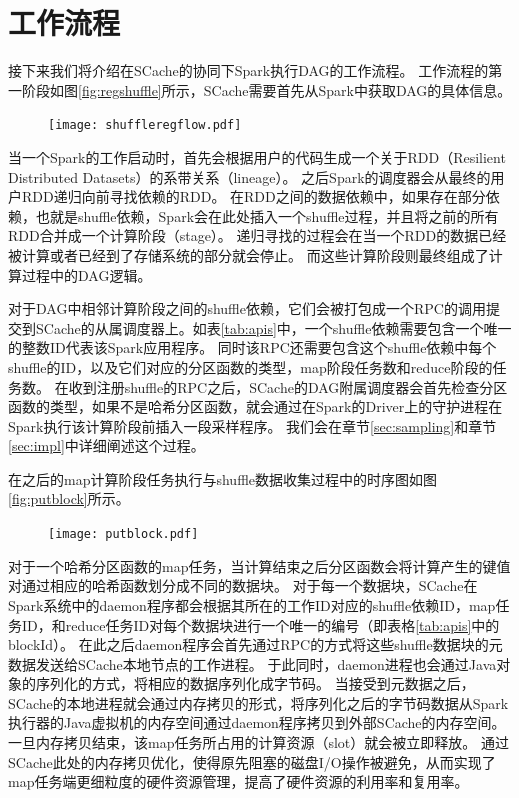 \section{工作流程}

接下来我们将介绍在SCache的协同下Spark执行DAG的工作流程。
工作流程的第一阶段如图\ref{fig:regshuffle}所示，SCache需要首先从Spark中获取DAG的具体信息。

\begin{figure}[!htp]
	\centering
	\texttt{[image: shuffleregflow.pdf]}
\end{figure}

当一个Spark的工作启动时，首先会根据用户的代码生成一个关于RDD（Resilient Distributed Datasets）的系带关系（lineage）。
之后Spark的调度器会从最终的用户RDD递归向前寻找依赖的RDD。
在RDD之间的数据依赖中，如果存在部分依赖，也就是shuffle依赖，Spark会在此处插入一个shuffle过程，并且将之前的所有RDD合并成一个计算阶段（stage）。
递归寻找的过程会在当一个RDD的数据已经被计算或者已经到了存储系统的部分就会停止。
而这些计算阶段则最终组成了计算过程中的DAG逻辑。

对于DAG中相邻计算阶段之间的shuffle依赖，它们会被打包成一个RPC的调用提交到SCache的从属调度器上。如表\ref{tab:apis}中，一个shuffle依赖需要包含一个唯一的整数ID代表该Spark应用程序。
同时该RPC还需要包含这个shuffle依赖中每个shuffle的ID，以及它们对应的分区函数的类型，map阶段任务数和reduce阶段的任务数。
在收到注册shuffle的RPC之后，SCache的DAG附属调度器会首先检查分区函数的类型，如果不是哈希分区函数，就会通过在Spark的Driver上的守护进程在Spark执行该计算阶段前插入一段采样程序。
我们会在章节\ref{sec:sampling}和章节\ref{sec:impl}中详细阐述这个过程。

在之后的map计算阶段任务执行与shuffle数据收集过程中的时序图如图\ref{fig:putblock}所示。

\begin{figure}[!htp]
	\centering
	\texttt{[image: putblock.pdf]}
\end{figure}

对于一个哈希分区函数的map任务，当计算结束之后分区函数会将计算产生的键值对通过相应的哈希函数划分成不同的数据块。
对于每一个数据块，SCache在Spark系统中的daemon程序都会根据其所在的工作ID对应的shuffle依赖ID，map任务ID，和reduce任务ID对每个数据块进行一个唯一的编号（即表格\ref{tab:apis}中的blockId）。
在此之后daemon程序会首先通过RPC的方式将这些shuffle数据块的元数据发送给SCache本地节点的工作进程。
于此同时，daemon进程也会通过Java对象的序列化的方式，将相应的数据序列化成字节码。
当接受到元数据之后，SCache的本地进程就会通过内存拷贝的形式，将序列化之后的字节码数据从Spark执行器的Java虚拟机的内存空间通过daemon程序拷贝到外部SCache的内存空间。
一旦内存拷贝结束，该map任务所占用的计算资源（slot）就会被立即释放。
通过SCache此处的内存拷贝优化，使得原先阻塞的磁盘I/O操作被避免，从而实现了map任务端更细粒度的硬件资源管理，提高了硬件资源的利用率和复用率。

